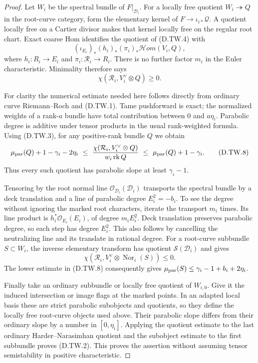 \begin{proof}
Let $W_i$ be the spectral bundle of $F|_{\mathcal D_i}$.
For a locally free quotient $W_i\twoheadrightarrow Q$
in the root-curve category, form the elementary kernel
of $F\to\iota_{i*}\mathcal Q$. A quotient locally free
on a Cartier divisor makes that kernel locally free
on the regular root chart. Exact coarse Hom identifies
the quotient of (D.TW.4) with
\[
 (\iota_{E_i})_* (h_i)_*
        (\pi_i)_*\mathcal Hom(V_i,Q),
                                                        \tag{D.TW.6}
\]
where $h_i:R_i\to E_i$ and
$\pi_i:\mathcal R_i\to R_i$. There is no further
factor $m_i$ in the Euler characteristic. Minimality
therefore says
\[
                   \chi(\mathcal R_i,V_i^\vee\otimes Q)
                                  \geq0.              \tag{D.TW.7}
\]

For clarity the numerical estimate needed here follows
directly from ordinary curve Riemann--Roch and (D.TW.1).
Tame pushforward is exact; the normalized weights of a
rank-$a$ bundle have total contribution between $0$
and $a\eta_i$. Parabolic degree is additive under
tensor products in the usual rank-weighted formula.
Using (D.TW.3), for any positive-rank bundle $Q$ we obtain
\[
 \mu_{\rm par}(Q)+1-\gamma_i-2\eta_i
 \ \leq\
 \frac{\chi(\mathcal R_i,V_i^\vee\otimes Q)}
                  {w_i\operatorname{rk}Q}
 \ \leq\ \mu_{\rm par}(Q)+1-\gamma_i.
                                                        \tag{D.TW.8}
\]
Thus every such quotient has parabolic slope at least
$\gamma_i-1$.

Tensoring by the root normal line
$\mathcal O_{\mathcal D_i}(\mathcal D_i)$ transports
the spectral bundle by a deck translation and a line
of parabolic degree $E_i^2=-b_i$. To see the degree
without ignoring the marked root characters, iterate
the transport $m_i$ times. Its line product is
$h_i^*\mathcal O_{E_i}(E_i)$, of degree $m_i E_i^2$.
Deck translation preserves parabolic degree, so each
step has degree $E_i^2$. This also follows by cancelling
the neutralizing line and its translate in rational
degree. For a root-curve subbundle $S\subset W_i$,
the inverse elementary transform has quotient
$\mathcal S(\mathcal D_i)$ and gives
\[
       \chi(\mathcal R_i,V_i^\vee\otimes
                     \operatorname{Nor}_i(S))\leq0.
                                                        \tag{D.TW.9}
\]
The lower estimate in (D.TW.8) consequently gives
$\mu_{\rm par}(S)\leq\gamma_i-1+b_i+2\eta_i$.

Finally take an ordinary subbundle or locally free
quotient of $W_{i,0}$. Give it the induced intersection
or image flags at the marked points. In an adapted
local basis these are strict parabolic subobjects and
quotients, so they define the locally free root-curve
objects used above. Their parabolic slope differs
from their ordinary slope by a number in
$[0,\eta_i]$. Applying the quotient estimate to the
last ordinary Harder--Narasimhan quotient and the
subobject estimate to the first subbundle proves
(D.TW.2). This proves the assertion without assuming
tensor semistability in positive characteristic.
\end{proof}


